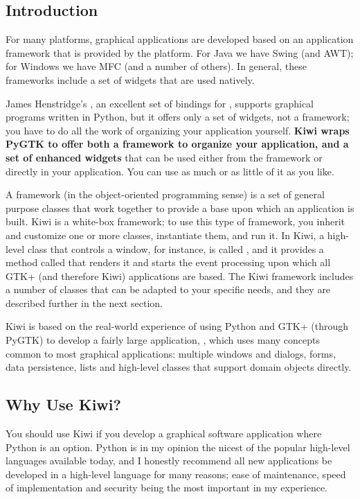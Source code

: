 \documentclass[a4paper]{howto}
\begin{document}
\subsection{Introduction}
For many platforms, graphical applications are developed based on an
application framework that is provided by the platform. For Java we have
Swing (and AWT); for Windows we have MFC (and a number of others). In
general, these frameworks include a set of widgets that are used
natively.

James Henstridge's
, an excellent
set of  bindings for
, supports graphical programs
written in Python, but it offers only a set of widgets, not a framework;
you have to do all the work of organizing your application yourself.
{\bf Kiwi wraps PyGTK to offer both a framework to organize your
application, and a set of enhanced widgets} that can be used either from
the framework or directly in your application. You can use as much or as
little of it as you like.

A framework (in the object-oriented programming sense) is a set of
general purpose classes that work together to provide a base upon which
an application is built. Kiwi is a white-box framework; to use this type
of framework, you inherit and customize one or more classes, instantiate
them, and run it. In Kiwi, a high-level class that controls a window,
for instance, is called , and it provides a method
called  that renders it and starts the event
processing upon which all GTK+ (and therefore Kiwi) applications are
based.  The Kiwi framework includes a number of classes that can be
adapted to your specific needs, and they are described further in the
next section.

Kiwi is based on the real-world experience of using Python and GTK+
(through PyGTK) to develop a fairly large application,
, which uses many concepts
common to most graphical applications: multiple windows and dialogs,
forms, data persistence, lists and high-level classes that support
domain objects directly.

\subsection{Why Use Kiwi?}

You should use Kiwi if you develop a graphical software application
where Python is an option. Python is in my opinion the nicest of
the popular high-level languages available today, and I honestly
recommend all new applications be developed in a high-level language
for many reasons; ease of maintenance, speed of implementation and
security being the most important in my experience.
\end{document}
